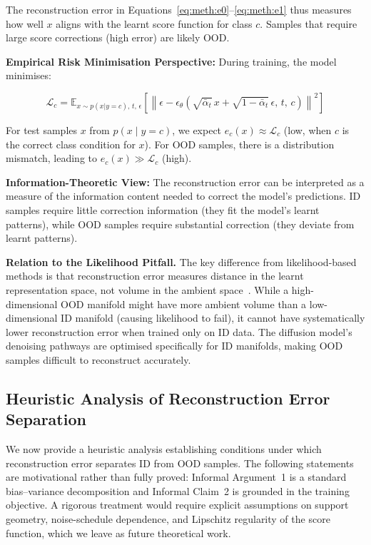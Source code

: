 The reconstruction error in Equations~\ref{eq:meth:e0}--\ref{eq:meth:e1} thus measures how well $x$ aligns with the learnt score function for class $c$. Samples that require large score corrections (high error) are likely OOD.

\textbf{Empirical Risk Minimisation Perspective:} During training, the model minimises:

\begin{equation}
\label{eq:meth:class_loss}
\mathcal{L}_c = \mathbb{E}_{x \sim p(x|y=c),\, t,\, \epsilon} \left[ \left\| \epsilon - \epsilon_\theta\!\left( \sqrt{\bar{\alpha}_t}\, x + \sqrt{1 - \bar{\alpha}_t}\,\epsilon,\, t,\, c \right) \right\|^2 \right]
\end{equation}

For test samples $x$ from $p(x \mid y = c)$, we expect $e_c(x) \approx \mathcal{L}_c$ (low, when $c$ is the correct class condition for $x$). For OOD samples, there is a distribution mismatch, leading to $e_c(x) \gg \mathcal{L}_c$ (high).

\textbf{Information-Theoretic View:} The reconstruction error can be interpreted as a measure of the information content needed to correct the model's predictions. ID samples require little correction information (they fit the model's learnt patterns), while OOD samples require substantial correction (they deviate from learnt patterns).

\textbf{Relation to the Likelihood Pitfall.} The key difference from likelihood-based methods is that reconstruction error measures distance in the learnt representation space, not volume in the ambient space~\cite{kirichenko2020why, fefferman2016manifold}. While a high-dimensional OOD manifold might have more ambient volume than a low-dimensional ID manifold (causing likelihood to fail), it cannot have systematically lower reconstruction error when trained only on ID data. The diffusion model's denoising pathways are optimised specifically for ID manifolds, making OOD samples difficult to reconstruct accurately.

\subsection{Heuristic Analysis of Reconstruction Error Separation}
\label{sec:meth:diffusion:formal}

We now provide a heuristic analysis establishing conditions under which reconstruction error separates ID from OOD samples. The following statements are motivational rather than fully proved: Informal Argument~1 is a standard bias--variance decomposition and Informal Claim~2 is grounded in the training objective. A rigorous treatment would require explicit assumptions on support geometry, noise-schedule dependence, and Lipschitz regularity of the score function, which we leave as future theoretical work.

